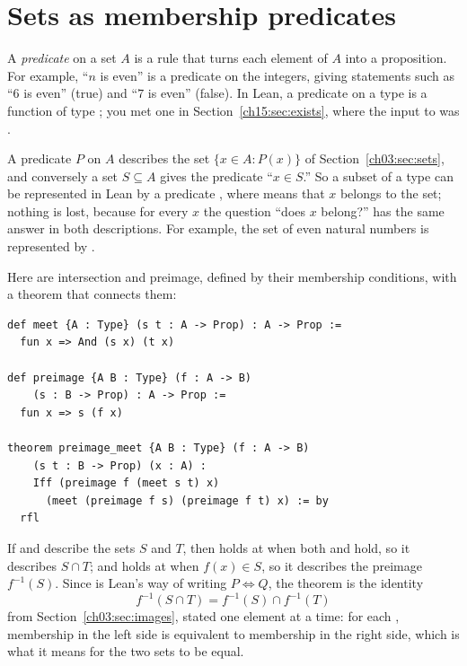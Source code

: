 \section{Sets as membership predicates}\label{ch16:sec:predicates}
A \emph{predicate} on a set $A$ is a rule that turns each element of $A$ into a proposition. For example, ``$n$ is even'' is a predicate on the integers, giving statements such as ``$6$ is even'' (true) and ``$7$ is even'' (false). In Lean, a predicate on a type  is a function of type ; you met one in Section~\ref{ch15:sec:exists}, where the input to  was .

A predicate $P$ on $A$ describes the set $\{x\in A:P(x)\}$ of Section~\ref{ch03:sec:sets}, and conversely a set $S\subseteq A$ gives the predicate ``$x\in S$.'' So a subset of a type  can be represented in Lean by a predicate , where  means that $x$ belongs to the set; nothing is lost, because for every $x$ the question ``does $x$ belong?'' has the same answer in both descriptions. For example, the set of even natural numbers is represented by .

Here are intersection and preimage, defined by their membership conditions, with a theorem that connects them:
\par\noindent\begin{minipage}{\linewidth}
\begin{lstlisting}
def meet {A : Type} (s t : A -> Prop) : A -> Prop :=
  fun x => And (s x) (t x)

def preimage {A B : Type} (f : A -> B)
    (s : B -> Prop) : A -> Prop :=
  fun x => s (f x)

theorem preimage_meet {A B : Type} (f : A -> B)
    (s t : B -> Prop) (x : A) :
    Iff (preimage f (meet s t) x)
      (meet (preimage f s) (preimage f t) x) := by
  rfl
\end{lstlisting}
\end{minipage}\par

If  and  describe the sets $S$ and $T$, then  holds at  when both  and  hold, so it describes $S\cap T$; and  holds at  when $f(x)\in S$, so it describes the preimage $f^{-1}(S)$. Since  is Lean's way of writing $P\Leftrightarrow Q$, the theorem  is the identity
\[
f^{-1}(S\cap T)=f^{-1}(S)\cap f^{-1}(T)
\]
from Section~\ref{ch03:sec:images}, stated one element at a time: for each , membership in the left side is equivalent to membership in the right side, which is what it means for the two sets to be equal.

